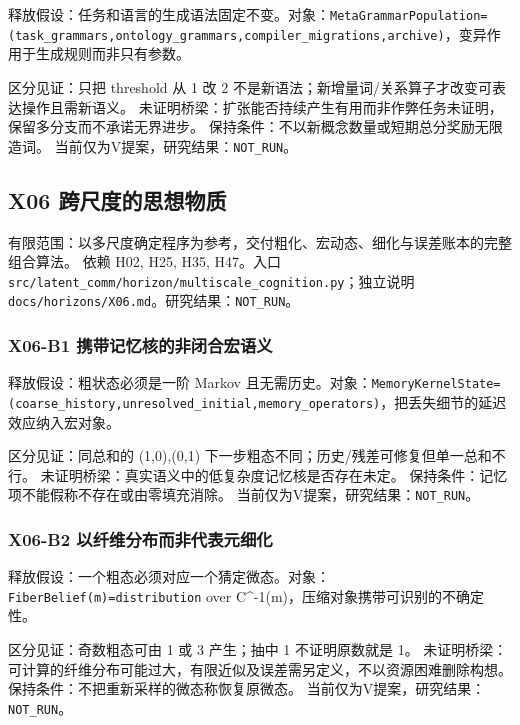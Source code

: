 \documentclass[
  10pt,
]{article}
\begin{document}
释放假设：任务和语言的生成语法固定不变。对象：\nolinkurl{MetaGrammarPopulation=(task_grammars,ontology_grammars,compiler_migrations,archive)}，变异作用于生成规则而非只有参数。

区分见证：只把 threshold 从 1 改 2
不是新语法；新增量词/关系算子才改变可表达操作且需新语义。
未证明桥梁：扩张能否持续产生有用而非作弊任务未证明，保留多分支而不承诺无界进步。
保持条件：不以新概念数量或短期总分奖励无限造词。
当前仅为V提案，研究结果：\nolinkurl{NOT_RUN}。

\subsection{X06
跨尺度的思想物质}\label{x06-ux8de8ux5c3aux5ea6ux7684ux601dux60f3ux7269ux8d28}

有限范围：以多尺度确定程序为参考，交付粗化、宏动态、细化与误差账本的完整组合算法。
依赖 H02, H25, H35, H47。入口
{\small\nolinkurl{src/latent_comm/horizon/multiscale_cognition.py}}；独立说明
{\small\nolinkurl{docs/horizons/X06.md}}。研究结果：\nolinkurl{NOT_RUN}。

\subsubsection{X06-B1
携带记忆核的非闭合宏语义}\label{x06-b1-ux643aux5e26ux8bb0ux5fc6ux6838ux7684ux975eux95edux5408ux5b8fux8bedux4e49}

释放假设：粗状态必须是一阶 Markov
且无需历史。对象：\nolinkurl{MemoryKernelState=(coarse_history,unresolved_initial,memory_operators)}，把丢失细节的延迟效应纳入宏对象。

区分见证：同总和的 (1,0),(0,1)
下一步粗态不同；历史/残差可修复但单一总和不行。
未证明桥梁：真实语义中的低复杂度记忆核是否存在未定。
保持条件：记忆项不能假称不存在或由零填充消除。
当前仅为V提案，研究结果：\nolinkurl{NOT_RUN}。

\subsubsection{X06-B2
以纤维分布而非代表元细化}\label{x06-b2-ux4ee5ux7ea4ux7ef4ux5206ux5e03ux800cux975eux4ee3ux8868ux5143ux7ec6ux5316}

释放假设：一个粗态必须对应一个猜定微态。对象：\nolinkurl{FiberBelief(m)=distribution}
over C\^{}-1(m)，压缩对象携带可识别的不确定性。

区分见证：奇数粗态可由 1 或 3 产生；抽中 1 不证明原数就是 1。
未证明桥梁：可计算的纤维分布可能过大，有限近似及误差需另定义，不以资源困难删除构想。
保持条件：不把重新采样的微态称恢复原微态。
当前仅为V提案，研究结果：\nolinkurl{NOT_RUN}。
\end{document}

